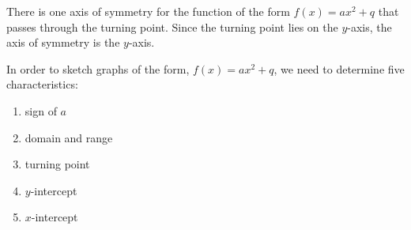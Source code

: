         \label{m39345*uid122}
            \nopagebreak
            
          
          \label{m39345*id244424}There is one axis of symmetry for the function of the form \begin{math}f\left(x\right)=a{x}^{2}+q\end{math} that passes through the turning point. Since the turning point lies on the \begin{math}y\end{math}-axis, the axis of symmetry is the \begin{math}y\end{math}-axis.\par 
        
        \label{m39345*uid123}
            \nopagebreak
            
          
          \label{m39345*id244525}In order to sketch graphs of the form, \begin{math}f\left(x\right)=a{x}^{2}+q\end{math}, we need to determine five characteristics:\par 
          \label{m39345*id244564}\begin{enumerate}[noitemsep, label=\textbf{\arabic*}. ] 
            \label{m39345*uid124}\item sign of \begin{math}a\end{math}\label{m39345*uid125}\item domain and range
\label{m39345*uid126}\item turning point
\label{m39345*uid127}\item \begin{math}y\end{math}-intercept
\label{m39345*uid128}\item \begin{math}x\end{math}-intercept
\end{enumerate}
        
